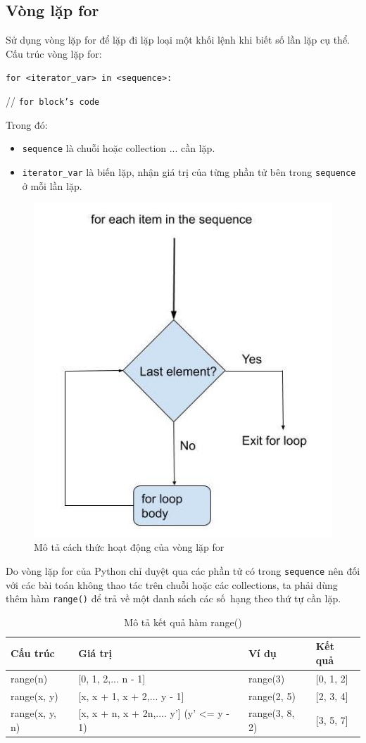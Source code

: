 \subsection{Vòng lặp for}
\label{for}
Sử dụng vòng lặp for để lặp đi lặp loại một khối lệnh khi biết số lần lặp cụ thể. Cấu trúc vòng lặp for:\par
\texttt{for <iterator\_var> in <sequence>:}\par
	\qquad // \texttt{for block's code}\par
Trong đó:
\begin{itemize}
	\itemsep\setlength{0em}
	\item \texttt{sequence} là chuỗi hoặc collection ... cần lặp.
	\item \texttt{iterator\_var} là biến lặp, nhận giá trị của từng phần tử bên trong \texttt{sequence} ở mỗi lần lặp.
\end{itemize}
\begin{figure}[h]
	\centering
	\includegraphics[width=0.5\linewidth]{img/for}
	\caption{Mô tả cách thức hoạt động của vòng lặp for}
\end{figure}
Do vòng lặp for của Python chỉ duyệt qua các phần tử có trong \texttt{sequence} nên đối với các bài toán không thao tác trên chuỗi hoặc các collections, ta phải dùng thêm hàm \texttt{range()} để trả về một danh sách các số~hạng theo thứ tự cần lặp.
\begin{table}[h]
	\centering
	\begin{tabular}{|l||l||l||l|}
		\hline
		Cấu trúc  & Giá trị & Ví dụ & Kết quả \\
		\hline
		range(n) & [0, 1, 2,... n - 1] & range(3) & [0, 1, 2] \\
		\hline
		range(x, y) & [x, x + 1, x + 2,... y - 1] & range(2, 5) & [2, 3, 4] \\
		\hline
		range(x, y, n) & [x, x + n, x + 2n,.... y'] (y' <= y - 1) & range(3, 8, 2) & [3, 5, 7] \\
		\hline
	\end{tabular}
	\caption{Mô tả kết quả hàm range()}
\end{table}
